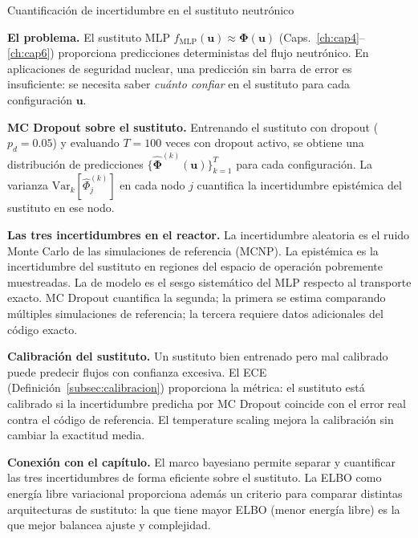 \begin{estrella}{Cuantificación de incertidumbre en el sustituto neutrónico}
\label{sec:estrella7}

\textbf{El problema.}
El sustituto MLP $f_{\text{MLP}}(\bm{u}) \approx \bm{\Phi}(\bm{u})$
(Caps.~\ref{ch:cap4}--\ref{ch:cap6}) proporciona predicciones
deterministas del flujo neutrónico. En aplicaciones de seguridad nuclear,
una predicción sin barra de error es insuficiente: se necesita saber
\emph{cuánto confiar} en el sustituto para cada configuración
$\bm{u}$.

\textbf{MC Dropout sobre el sustituto.}
Entrenando el sustituto con dropout ($p_d = 0.05$) y evaluando $T = 100$
veces con dropout activo, se obtiene una distribución de predicciones
$\{\hat{\bm{\Phi}}^{(k)}(\bm{u})\}_{k=1}^T$ para cada configuración.
La varianza $\text{Var}_k[\hat{\Phi}_j^{(k)}]$ en cada nodo $j$
cuantifica la incertidumbre epistémica del sustituto en ese nodo.

\textbf{Las tres incertidumbres en el reactor.}
La incertidumbre aleatoria es el ruido Monte Carlo de las simulaciones
de referencia (MCNP). La epistémica es la incertidumbre del sustituto
en regiones del espacio de operación pobremente muestreadas. La de
modelo es el sesgo sistemático del MLP respecto al transporte exacto.
MC Dropout cuantifica la segunda; la primera se estima comparando
múltiples simulaciones de referencia; la tercera requiere datos
adicionales del código exacto.

\textbf{Calibración del sustituto.}
Un sustituto bien entrenado pero mal calibrado puede predecir flujos con
confianza excesiva. El ECE (Definición~\ref{subsec:calibracion})
proporciona la métrica: el sustituto está calibrado si la incertidumbre
predicha por MC Dropout coincide con el error real contra el código de
referencia. El temperature scaling mejora la calibración sin cambiar la
exactitud media.

\textbf{Conexión con el capítulo.}
El marco bayesiano permite separar y cuantificar las tres incertidumbres
de forma eficiente sobre el sustituto. La ELBO como energía libre
variacional proporciona además un criterio para comparar distintas
arquitecturas de sustituto: la que tiene mayor ELBO (menor energía libre)
es la que mejor balancea ajuste y complejidad.
\end{estrella}


\printbibliography[heading=subbibliography]